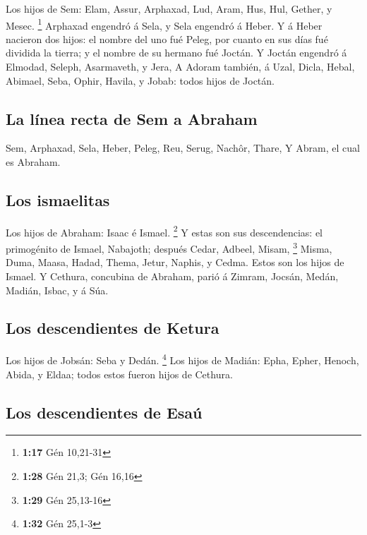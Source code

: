  Los hijos de Sem: Elam, Assur, Arphaxad, Lud, Aram, Hus,
Hul, Gether, y Mesec. \footnote{\textbf{1:17} Gén 10,21-31}
 Arphaxad engendró á Sela, y Sela engendró á Heber.
 Y á Heber nacieron dos hijos: el nombre del uno fué Peleg,
por cuanto en sus días fué dividida la tierra; y el nombre de su hermano
fué Joctán.  Y Joctán engendró á Elmodad, Seleph,
Asarmaveth, y Jera,  A Adoram también, á Uzal, Dicla,
 Hebal, Abimael, Seba,  Ophir, Havila, y
Jobab: todos hijos de Joctán.

\hypertarget{la-luxednea-recta-de-sem-a-abraham}{%
\subsection{La línea recta de Sem a
Abraham}\label{la-luxednea-recta-de-sem-a-abraham}}

 Sem, Arphaxad, Sela,  Heber, Peleg, Reu,
 Serug, Nachôr, Thare,  Y Abram, el cual es
Abraham.

\hypertarget{los-ismaelitas}{%
\subsection{Los ismaelitas}\label{los-ismaelitas}}

 Los hijos de Abraham: Isaac é Ismael. \footnote{\textbf{1:28}
  Gén 21,3; Gén 16,16}  Y estas son sus descendencias: el
primogénito de Ismael, Nabajoth; después Cedar, Adbeel, Misam,
\footnote{\textbf{1:29} Gén 25,13-16}  Misma, Duma, Maasa,
Hadad, Thema, Jetur, Naphis, y Cedma. Estos son los hijos de Ismael.
 Y Cethura, concubina de Abraham, parió á Zimram, Jocsán,
Medán, Madián, Isbac, y á Súa.

\hypertarget{los-descendientes-de-ketura}{%
\subsection{Los descendientes de
Ketura}\label{los-descendientes-de-ketura}}

 Los hijos de Jobsán: Seba y Dedán. \footnote{\textbf{1:32}
  Gén 25,1-3}  Los hijos de Madián: Epha, Epher, Henoch,
Abida, y Eldaa; todos estos fueron hijos de Cethura.

\hypertarget{los-descendientes-de-esauxfa}{%
\subsection{Los descendientes de
Esaú}\label{los-descendientes-de-esauxfa}}


